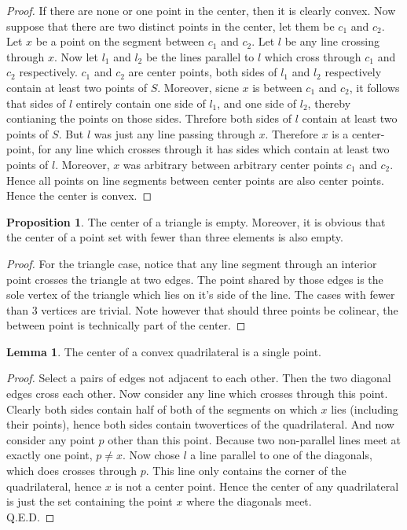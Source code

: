 \documentclass[12pt]{article}
\theoremstyle{definition}
\newtheorem{lemma}{Lemma}
\newtheorem{proposition}{Proposition}
\begin{document}
\begin{proof}
If there are none or one point in the center, then it is clearly convex. Now suppose that there are two distinct points in the center, let them be $c_1$ and $c_2$. Let $x$ be a point on the segment between $c_1$ and $c_2$. Let $l$ be any line crossing through $x$. Now let $l_1$ and $l_2$ be the lines parallel to $l$ which cross through $c_1$ and $c_2$ respectively. $c_1$ and $c_2$ are center points, both sides of $l_1$ and $l_2$ respectively contain at least two points of $S$. Moreover, sicne $x$ is between $c_1$ and $c_2$, it follows that sides of $l$ entirely contain one side of $l_1$, and one side of $l_2$, thereby contianing the points on those sides. Threfore both sides of $l$ contain at least two points of $S$. But $l$ was just any line passing through $x$. Therefore $x$ is a center-point, for any line which crosses through it has sides which contain at least two points of $l$. Moreover, $x$ was arbitrary between arbitrary center points $c_1$ and $c_2$. Hence all points on line segments between center points are also center points. Hence the center is convex.
\end{proof}

\begin{proposition}
The center of a triangle is empty. Moreover, it is obvious that the center of a point set with fewer than three elements is also empty.
\end{proposition}

\begin{proof}
For the triangle case, notice that any line segment through an interior point crosses the triangle at two edges. The point shared by those edges is the sole vertex of the triangle which lies on it's side of the line. The cases with fewer than $3$ vertices are trivial. Note however that should three points be colinear, the between point is technically part of the center.
\end{proof}

\begin{lemma}
The center of a convex quadrilateral is a single point.
\end{lemma}

\begin{proof}
Select a pairs of edges not adjacent to each other. Then the two diagonal edges cross each other. Now consider any line which crosses through this point. Clearly both sides contain half of both of the segments on which $x$ lies (including their points), hence both sides contain twovertices of the quadrilateral. And now consider any point $p$ other than this point. Because two non-parallel lines meet at exactly one point, $p\ne x$. Now chose $l$ a line parallel to one of the diagonals, which does crosses through $p$. This line only contains the corner of the quadrilateral, hence $x$ is not a center point. Hence the center of any quadrilateral is just the set containing the point $x$ where the diagonals meet.\\


Q.E.D.
\end{proof}
\end{document}

